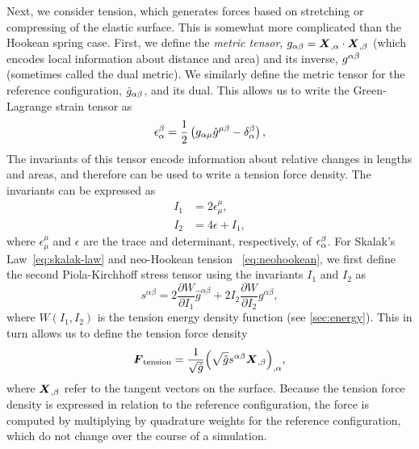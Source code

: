 Next, we consider tension, which generates forces based on stretching or compressing of the elastic surface. This
is somewhat more complicated than the Hookean spring case.  First, we define the \emph{metric tensor},
$g_{\alpha\beta} = \boldsymbol{X}_{,\alpha}\cdot\boldsymbol{X}_{,\beta}$  (which encodes local information about distance and area)
and its inverse, $g^{\alpha\beta}$ (sometimes called the dual metric). We similarly define the metric tensor
for the reference configuration, $\hat{g}_{\alpha\beta}$, and its dual. This allows us to write the
Green-Lagrange strain tensor as
\begin{equation}
    \epsilon_\alpha^\beta = \frac12\left(g_{\alpha\mu}\hat{g}^{\mu\beta}-\delta_\alpha^\beta\right),
\end{equation}
The invariants of this tensor encode information about relative changes in lengths and areas, and therefore can be
used to write a tension force density. The invariants can be expressed as
\begin{align}
    I_1 &= 2\epsilon_\mu^\mu, \\
    I_2 &= 4\epsilon + I_1,
\end{align}
where $\epsilon_\mu^\mu$ and $\epsilon$ are the trace and determinant, respectively, of
$\epsilon_\alpha^{\smash\beta}$. For Skalak's Law~\eqref{eq:skalak-law} and neo-Hookean tension~%
\eqref{eq:neohookean}, we first define the second Piola-Kirchhoff stress tensor using the invariants $I_1$ and
$I_2$ as
\begin{equation}
    s^{\alpha\beta} = 2\frac{\partial W}{\partial I_1} \hat{g}^{\alpha\beta} + 2I_2\frac{\partial W}{\partial I_2} g^{\alpha\beta},
\end{equation}
where $W(I_1, I_2)$ is the tension energy density function (see \cref{sec:energy}). This in turn allows us to
define the tension force density~\cite{Maxian:2018ek}
\begin{equation}\label{eq:tension-force}
    \boldsymbol{F}_\text{tension} = \frac{1}{\sqrt{\hat{g}}}{\left(\sqrt{\hat{g}}s^{\alpha\beta}\boldsymbol{X}_{,\beta}\right)}_{,\alpha},
\end{equation}
where $\boldsymbol{X}_{,\beta}$ refer to the tangent vectors on the surface. Because the tension force density is expressed in
relation to the reference configuration, the force is computed by multiplying by quadrature weights for the
reference configuration, which do not change over the course of a simulation.

